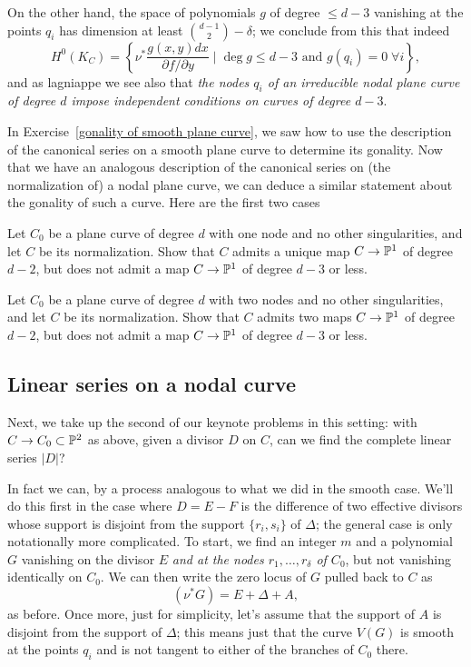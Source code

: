 On the other hand, the space of polynomials $g$ of degree $\leq d-3$ vanishing at the points $q_i$ has dimension at least $ \binom{d-1}{2} - \delta$; we conclude from this that indeed
$$
H^0(K_C) =  \left\{ \nu^* \frac{g(x,y)dx}{\partial f/\partial y} \mid \deg g \leq d-3 \text{ and } g(q_i) = 0 \; \forall i \right\},
$$
and as lagniappe we see also that \emph{the nodes $q_i$ of an irreducible nodal plane curve of degree $d$ impose independent conditions on curves of degree $d-3$}.

In Exercise~\ref{gonality of smooth plane curve}, we saw how to use the description of the canonical series on a smooth plane curve to determine its gonality. Now that we have an analogous description of the canonical series on (the normalization of) a nodal plane curve, we can deduce a similar statement about the gonality of such a curve. Here are the first two cases  

\begin{exercise}
Let $C_0$ be a plane curve of degree $d$ with one node and no other singularities, and let $C$ be its normalization. Show that $C$ admits a unique map $C \to {\mathbb P}^1$ of degree $d-2$, but does not admit a map $C \to {\mathbb P}^1$ of degree $d-3$ or less.
\end{exercise}

\begin{exercise}
Let $C_0$ be a plane curve of degree $d$ with two nodes and no other singularities, and let $C$ be its normalization. Show that $C$ admits two maps $C \to {\mathbb P}^1$ of degree $d-2$, but does not admit a map $C \to {\mathbb P}^1$ of degree $d-3$ or less.
\end{exercise}


\subsection{Linear series on a nodal curve}

Next, we take up the second of our keynote problems in this setting: with $C \to C_0 \subset {\mathbb P}^2$ as above, given a divisor $D$ on $C$, can we find the complete linear series $|D|$?

In fact we can, by a process analogous to what we did in the smooth case. We'll do this first in the case where $D = E-F$ is the difference of two effective divisors whose support is disjoint from the support $\{r_i, s_i\}$ of $\Delta$; the general case is only notationally more complicated. To start, we find an integer $m$ and a polynomial $G$ vanishing on the divisor $E$ \emph{and at the nodes $r_1,\dots,r_\delta$ of $C_0$}, but not vanishing identically on $C_0$. We can then write the zero locus of $G$ pulled back to $C$ as
$$
(\nu^*G) = E + \Delta + A,
$$
as before. Once more, just for simplicity, let's assume that the support of $A$ is disjoint from the support of $\Delta$; this means just that the curve $V(G)$ is smooth at the points $q_i$ and is not tangent to either of the branches of $C_0$ there.

